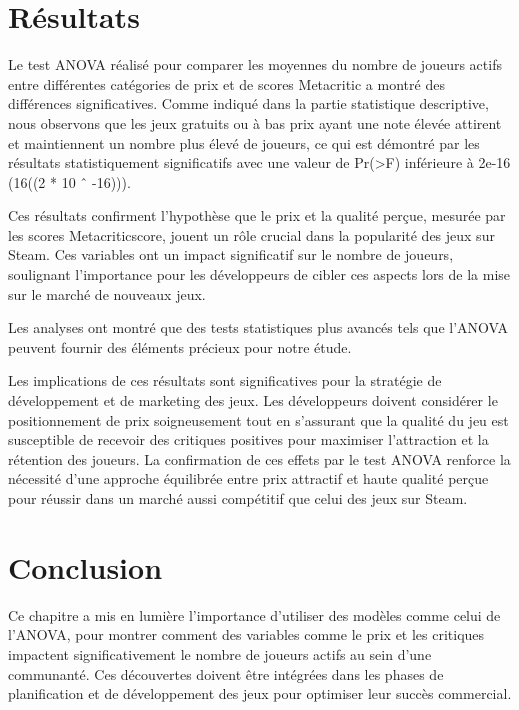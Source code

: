 \documentclass[mstat,12pt]{unswthesis}
\begin{document}
\hypertarget{ruxe9sultats}{%
\section{Résultats}\label{ruxe9sultats}}

Le test ANOVA réalisé pour comparer les moyennes du nombre de joueurs
actifs entre différentes catégories de prix et de scores Metacritic a
montré des différences significatives. Comme indiqué dans la partie
statistique descriptive, nous observons que les jeux gratuits ou à bas
prix ayant une note élevée attirent et maintiennent un nombre plus élevé
de joueurs, ce qui est démontré par les résultats statistiquement
significatifs avec une valeur de Pr(\textgreater F) inférieure à 2e-16
(16((2 * 10 ˆ -16))).

\medskip

Ces résultats confirment l'hypothèse que le prix et la qualité perçue,
mesurée par les scores Metacriticscore, jouent un rôle crucial dans la
popularité des jeux sur Steam. Ces variables ont un impact significatif
sur le nombre de joueurs, soulignant l'importance pour les développeurs
de cibler ces aspects lors de la mise sur le marché de nouveaux jeux.

Les analyses ont montré que des tests statistiques plus avancés tels que
l'ANOVA peuvent fournir des éléments précieux pour notre étude.

Les implications de ces résultats sont significatives pour la stratégie
de développement et de marketing des jeux. Les développeurs doivent
considérer le positionnement de prix soigneusement tout en s'assurant
que la qualité du jeu est susceptible de recevoir des critiques
positives pour maximiser l'attraction et la rétention des joueurs. La
confirmation de ces effets par le test ANOVA renforce la nécessité d'une
approche équilibrée entre prix attractif et haute qualité perçue pour
réussir dans un marché aussi compétitif que celui des jeux sur Steam.

\hypertarget{conclusion}{%
\section{Conclusion}\label{conclusion}}

Ce chapitre a mis en lumière l'importance d'utiliser des modèles comme
celui de l'ANOVA, pour montrer comment des variables comme le prix et
les critiques impactent significativement le nombre de joueurs actifs au
sein d'une communanté. Ces découvertes doivent être intégrées dans les
phases de planification et de développement des jeux pour optimiser leur
succès commercial.
\end{document}
